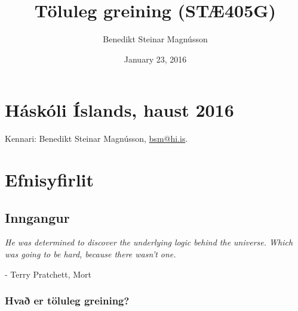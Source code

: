 \documentclass[a4paper,10pt,icelandic]{sphinxmanual}
\title{Töluleg greining (STÆ405G)}
\date{January 23, 2016}
\author{Benedikt Steinar Magnússon}
\begin{document}
\maketitle
\tableofcontents
{}\label{index::doc}



\chapter{Háskóli Íslands, haust 2016}
\label{index:toluleg-greining-stae405g}\label{index:haskoli-islands-haust-2016}
Kennari: Benedikt Steinar Magnússon, \href{mailto:bsm@hi.is}{bsm@hi.is}.


\chapter{Efnisyfirlit}
\label{index:efnisyfirlit}

\section{Inngangur}
\label{kafli01:inngangur}\label{kafli01::doc}
\emph{He was determined to discover the underlying logic behind the universe. Which was going to be hard, because there wasn't one.}

- Terry Pratchett, Mort


\subsection{Hvað er töluleg greining?}
\label{kafli01:hva-er-toluleg-greining}
\end{document}
